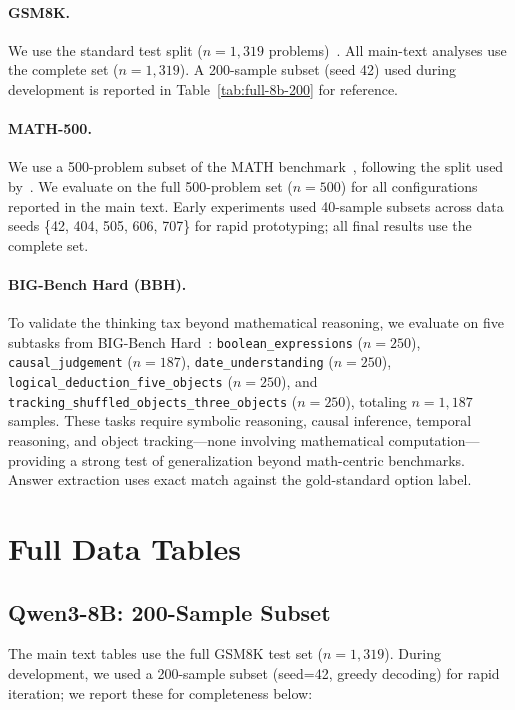 \paragraph{GSM8K.} We use the standard test split ($n{=}1{,}319$ problems)~\citep{cobbe2021gsm8k}.
All main-text analyses use the complete set ($n{=}1{,}319$).
A 200-sample subset (seed 42) used during development is reported
in Table~\ref{tab:full-8b-200} for reference.

\paragraph{MATH-500.} We use a 500-problem subset of the MATH benchmark~\citep{hendrycks2021math},
following the split used by~\citet{lightman2023prm}.
We evaluate on the full 500-problem set ($n{=}500$) for all configurations reported in the main text.
Early experiments used 40-sample subsets across data seeds \{42, 404, 505, 606, 707\} for rapid prototyping; all final results use the complete set.

\paragraph{BIG-Bench Hard (BBH).}
To validate the thinking tax beyond mathematical reasoning, we evaluate on
five subtasks from BIG-Bench Hard~\citep{suzgun2023challenging}:
\texttt{boolean\_expressions} ($n{=}250$),
\texttt{causal\_judgement} ($n{=}187$),
\texttt{date\_understanding} ($n{=}250$),
\texttt{logical\_deduction\_five\_objects} ($n{=}250$), and
\texttt{tracking\_shuffled\_objects\_three\_objects} ($n{=}250$),
totaling $n{=}1{,}187$ samples.
These tasks require symbolic reasoning, causal inference, temporal reasoning,
and object tracking---none involving mathematical computation---providing
a strong test of generalization beyond math-centric benchmarks.
Answer extraction uses exact match against the gold-standard option label.

\section{Full Data Tables}
\label{app:full-tables}

\subsection{Qwen3-8B: 200-Sample Subset}

The main text tables use the full GSM8K test set ($n{=}1{,}319$).
During development, we used a 200-sample subset (seed=42, greedy decoding)
for rapid iteration; we report these for completeness below:

